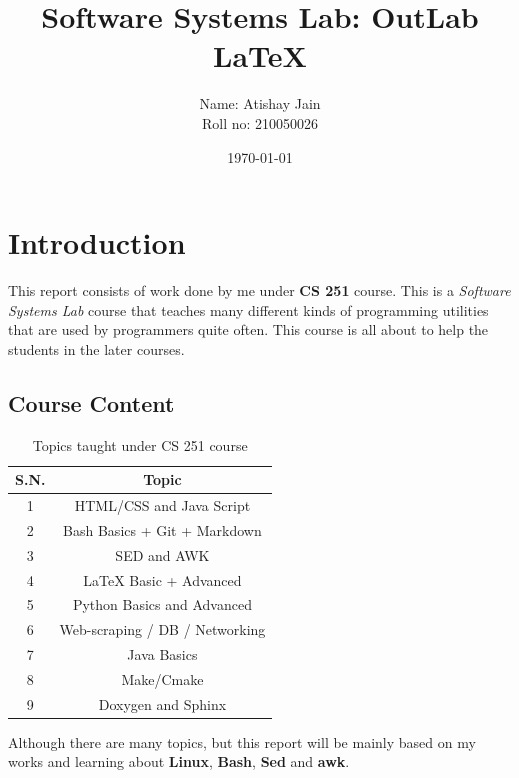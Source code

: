 \documentclass[12pt]{article}
\title{\textbf{\huge Software Systems Lab: OutLab \LaTeX}}
\date{\LARGE \today}
\author{\Large Name: Atishay Jain \\ Roll no: 210050026}
\begin{document}
\begin{titlingpage}
    \maketitle    
\end{titlingpage}

\tableofcontents

\newpage

\section{Introduction}
\vspace{1 em}
This report consists of work done by me under \textbf{CS 251} course. This is a \textit{Software Systems Lab} course that teaches many different kinds of programming utilities that are used by programmers quite often. This course is all about to help the students in the later courses. 

\subsection{Course Content}
\begin{table}[H]
    \centering
    \begin{tabular}{ |c|c| }
         \hline
         \textbf{S.N.} & \textbf{Topic} \\
         \hline
         1 & HTML/CSS and Java Script \\
         \hline
         2 & Bash Basics + Git + Markdown \\
         \hline
         3 & SED and AWK \\
         \hline
         4 & \LaTeX \hspace{0.2 ex} Basic + Advanced \\
         \hline
         5 & Python Basics and Advanced \\
         \hline
         6 & Web-scraping / DB / Networking \\
         \hline
         7 & Java Basics \\
         \hline
         8 & Make/Cmake \\
         \hline
         9 & Doxygen and Sphinx \\
         \hline
    \end{tabular}
    \caption{Topics taught under CS 251 course}
    \label{tab:my_label}
\end{table}
Although there are many topics, but this report will be mainly based on my works and learning about \textbf{Linux}, \textbf{Bash}, \textbf{Sed} and \textbf{awk}.
\end{document}
